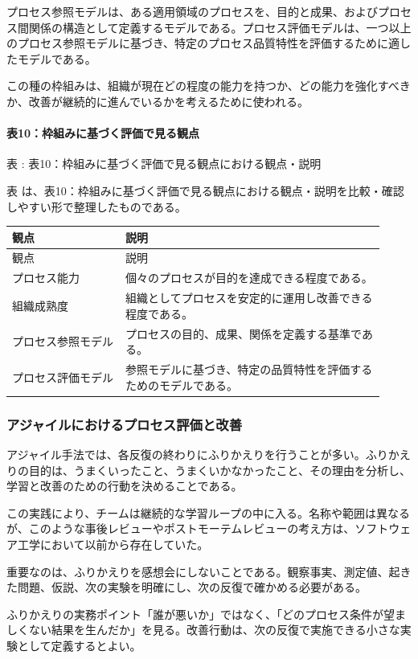 プロセス参照モデルは、ある適用領域のプロセスを、目的と成果、およびプロセス間関係の構造として定義するモデルである。プロセス評価モデルは、一つ以上のプロセス参照モデルに基づき、特定のプロセス品質特性を評価するために適したモデルである。

この種の枠組みは、組織が現在どの程度の能力を持つか、どの能力を強化すべきか、改善が継続的に進んでいるかを考えるために使われる。

\paragraph{表10：枠組みに基づく評価で見る観点}
\par\smallskip\noindent{}\label{tab:ch10-10}表 \thetable: 表10：枠組みに基づく評価で見る観点における観点・説明\par\smallskip
表 \thetable は、表10：枠組みに基づく評価で見る観点における観点・説明を比較・確認しやすい形で整理したものである。\par\smallskip
\begin{longtable}{>{\raggedright\arraybackslash}p{0.28\linewidth}>{\raggedright\arraybackslash}p{0.64\linewidth}}
\toprule
観点 & 説明\\
\midrule
\endfirsthead
\toprule
観点 & 説明\\
\midrule
\endhead
プロセス能力 & 個々のプロセスが目的を達成できる程度である。\\
組織成熟度 & 組織としてプロセスを安定的に運用し改善できる程度である。\\
プロセス参照モデル & プロセスの目的、成果、関係を定義する基準である。\\
プロセス評価モデル & 参照モデルに基づき、特定の品質特性を評価するためのモデルである。\\
\bottomrule
\end{longtable}
\subsubsection{アジャイルにおけるプロセス評価と改善}
アジャイル手法では、各反復の終わりにふりかえりを行うことが多い。ふりかえりの目的は、うまくいったこと、うまくいかなかったこと、その理由を分析し、学習と改善のための行動を決めることである。

この実践により、チームは継続的な学習ループの中に入る。名称や範囲は異なるが、このような事後レビューやポストモーテムレビューの考え方は、ソフトウェア工学において以前から存在していた。

重要なのは、ふりかえりを感想会にしないことである。観察事実、測定値、起きた問題、仮説、次の実験を明確にし、次の反復で確かめる必要がある。

\begin{pointbox}{ふりかえりの実務ポイント}「誰が悪いか」ではなく、「どのプロセス条件が望ましくない結果を生んだか」を見る。改善行動は、次の反復で実施できる小さな実験として定義するとよい。\end{pointbox}
